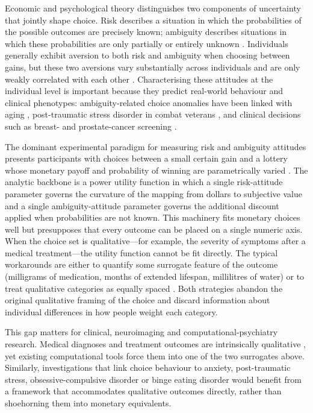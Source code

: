 \documentclass[11pt]{article}
\begin{document}
Economic and psychological theory distinguishes two components of uncertainty that jointly shape choice. Risk describes a situation in which the probabilities of the possible outcomes are precisely known; ambiguity describes situations in which these probabilities are only partially or entirely unknown \citep{ellsberg1961risk,trimmer2011bayesians}. Individuals generally exhibit aversion to both risk and ambiguity when choosing between gains, but these two aversions vary substantially across individuals and are only weakly correlated with each other \citep{levy2010neural,tymula2013lifespan}. Characterising these attitudes at the individual level is important because they predict real-world behaviour and clinical phenotypes: ambiguity-related choice anomalies have been linked with aging \citep{tymula2013lifespan}, post-traumatic stress disorder in combat veterans \citep{ruderman2016ptsd}, and clinical decisions such as breast- and prostate-cancer screening \citep{yeh2015dense,james2017prostate}.

The dominant experimental paradigm for measuring risk and ambiguity attitudes presents participants with choices between a small certain gain and a lottery whose monetary payoff and probability of winning are parametrically varied \citep{levy2010neural,levy2012measuring,jia2020learning}. The analytic backbone is a power utility function in which a single risk-attitude parameter governs the curvature of the mapping from dollars to subjective value and a single ambiguity-attitude parameter governs the additional discount applied when probabilities are not known. This machinery fits monetary choices well but presupposes that every outcome can be placed on a single numeric axis. When the choice set is qualitative---for example, the severity of symptoms after a medical treatment---the utility function cannot be fit directly. The typical workarounds are either to quantify some surrogate feature of the outcome (milligrams of medication, months of extended lifespan, millilitres of water) or to treat qualitative categories as equally spaced \citep{bijlenga2007balance,basu2018vio}. Both strategies abandon the original qualitative framing of the choice and discard information about individual differences in how people weight each category.

This gap matters for clinical, neuroimaging and computational-psychiatry research. Medical diagnoses and treatment outcomes are intrinsically qualitative \citep{basu2018vio,james2017prostate}, yet existing computational tools force them into one of the two surrogates above. Similarly, investigations that link choice behaviour to anxiety, post-traumatic stress, obsessive-compulsive disorder or binge eating disorder \citep{ruderman2016ptsd,voon2015bed} would benefit from a framework that accommodates qualitative outcomes directly, rather than shoehorning them into monetary equivalents.
\end{document}
